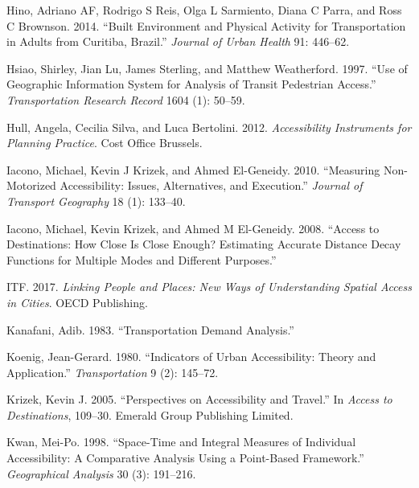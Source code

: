 \documentclass[preprint, 3p,
authoryear]{elsarticle} %
\newlength{\cslhangindent}
\newlength{\cslentryspacingunit} %
\newenvironment{CSLReferences}[2] %
 {%
  \setlength{\parindent}{0pt}
  \ifodd #1
  \let\oldpar\par
  \def\par{\hangindent=\cslhangindent\oldpar}
  \fi
  \setlength{\parskip}{#2\cslentryspacingunit}
 }%
 {}
\begin{document}
\begin{CSLReferences}{1}{0}
\leavevmode{}%
Hino, Adriano AF, Rodrigo S Reis, Olga L Sarmiento, Diana C Parra, and
Ross C Brownson. 2014. {``Built Environment and Physical Activity for
Transportation in Adults from Curitiba, Brazil.''} \emph{Journal of
Urban Health} 91: 446--62.

\leavevmode{}%
Hsiao, Shirley, Jian Lu, James Sterling, and Matthew Weatherford. 1997.
{``Use of Geographic Information System for Analysis of Transit
Pedestrian Access.''} \emph{Transportation Research Record} 1604 (1):
50--59.

\leavevmode{}%
Hull, Angela, Cecilia Silva, and Luca Bertolini. 2012.
\emph{Accessibility Instruments for Planning Practice}. Cost Office
Brussels.

\leavevmode{}%
Iacono, Michael, Kevin J Krizek, and Ahmed El-Geneidy. 2010.
{``Measuring Non-Motorized Accessibility: Issues, Alternatives, and
Execution.''} \emph{Journal of Transport Geography} 18 (1): 133--40.

\leavevmode{}%
Iacono, Michael, Kevin Krizek, and Ahmed M El-Geneidy. 2008. {``Access
to Destinations: How Close Is Close Enough? Estimating Accurate Distance
Decay Functions for Multiple Modes and Different Purposes.''}

\leavevmode{}%
ITF. 2017. \emph{Linking People and Places: New Ways of Understanding
Spatial Access in Cities}. OECD Publishing.

\leavevmode{}%
Kanafani, Adib. 1983. {``Transportation Demand Analysis.''}

\leavevmode{}%
Koenig, Jean-Gerard. 1980. {``Indicators of Urban Accessibility: Theory
and Application.''} \emph{Transportation} 9 (2): 145--72.

\leavevmode{}%
Krizek, Kevin J. 2005. {``Perspectives on Accessibility and Travel.''}
In \emph{Access to Destinations}, 109--30. Emerald Group Publishing
Limited.

\leavevmode{}%
Kwan, Mei-Po. 1998. {``Space-Time and Integral Measures of Individual
Accessibility: A Comparative Analysis Using a Point-Based Framework.''}
\emph{Geographical Analysis} 30 (3): 191--216.


\end{CSLReferences}
\end{document}
